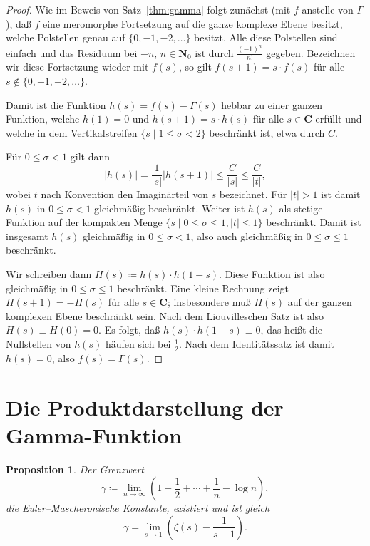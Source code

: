 \documentclass[a4paper,twoside,openright]{report}
\newtheorem{prop}[thm]{Proposition}
\theoremstyle{definition}
\theoremstyle{remark}
\begin{document}
\begin{proof}
  Wie im Beweis von Satz~\ref{thm:gamma} folgt zunächst (mit $f$ anstelle von
  $\Gamma$), daß $f$ eine meromorphe Fortsetzung auf die ganze komplexe
  Ebene besitzt, welche Polstellen genau auf $\{0, -1, -2, \dotsc\}$ besitzt.
  Alle diese Polstellen sind einfach und das Residuum bei $-n$, $n \in \mathbf
  N_0$ ist durch $\frac{(-1)^n}{n!}$ gegeben. Bezeichnen wir diese Fortsetzung
  wieder mit $f(s)$, so gilt $f(s + 1) = s \cdot f(s)$ für alle $s \notin
  \{0, -1, -2, \dotsc\}$.
  
  Damit ist die Funktion $h(s) = f(s) - \Gamma(s)$ hebbar zu einer ganzen
  Funktion, welche $h(1) = 0$ und $h(s + 1) = s \cdot h(s)$ für alle $s \in \mathbf C$
  erfüllt und welche in dem Vertikalstreifen $\{s \mid 1 \leq \sigma < 2\}$  beschränkt
  ist, etwa durch $C$.
  
  Für $0 \leq \sigma < 1$ gilt dann
  \[
    |h(s)| = \frac{1}{|s|} |h(s + 1)| \leq \frac{C}{|s|} \leq \frac C{|t|},
  \]
  wobei $t$ nach Konvention den Imaginärteil von $s$ bezeichnet. Für $|t| > 1$ ist
  damit $h(s)$ in $0 \leq \sigma < 1$ gleichmäßig beschränkt. Weiter ist $h(s)$
  als stetige Funktion auf der kompakten Menge $\{s \mid 0 \leq \sigma \leq 1, |t| \leq 1\}$
  beschränkt. Damit ist insgesamt $h(s)$ gleichmäßig in $0 \leq \sigma < 1$, also auch 
  gleichmäßig in $0 \leq \sigma \leq 1$ beschränkt.
  
  Wir schreiben dann $H(s) \coloneqq h(s) \cdot h(1 - s)$. Diese Funktion ist
  also gleichmäßig in $0 \leq \sigma \leq 1$ beschränkt. Eine kleine
  Rechnung zeigt $H(s + 1) = - H(s)$ für alle $s \in \mathbf C$; insbesondere
  muß $H(s)$ auf der ganzen komplexen Ebene beschränkt sein. Nach dem Liouvilleschen
  Satz ist also $H(s) \equiv H(0) = 0$. Es folgt, daß $h(s) \cdot h(1 - s) \equiv 0$,
  das heißt die Nullstellen von $h(s)$ häufen sich bei $\frac 1 2$. Nach dem
  Identitätssatz ist damit $h(s) = 0$, also $f(s) = \Gamma(s)$. 
\end{proof}

\section{Die Produktdarstellung der Gamma-Funk\-tion}

\begin{prop}
  Der Grenzwert
  \[
    \gamma \coloneqq \lim_{n \to \infty} \left(1 + \frac 1 2 + \dotsb + \frac 1 n - \log n\right),
  \]
  die \emph{Euler--Mascheronische Konstante}, existiert und ist gleich
  \[
    \gamma = \lim_{s \to 1} \left(\zeta(s) - \frac 1 {s - 1}\right).
  \]
\end{prop}
\end{document}
